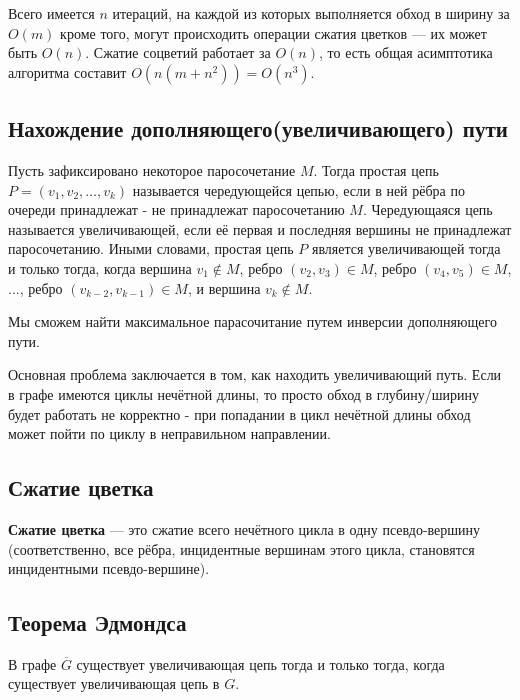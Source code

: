 \documentclass[14pt, a4paper]{extarticle}
\begin{document}
    Всего имеется $n$ итераций, на каждой из которых выполняется обход в ширину за $O(m)$ кроме того, могут происходить операции сжатия цветков — их может быть $O(n)$. Сжатие соцветий работает за $O(n)$, то есть общая асимптотика алгоритма составит $O(n(m+n^2))=O(n^3)$.

    \subsection*{Нахождение дополняющего(увеличивающего) пути}

    Пусть зафиксировано некоторое паросочетание $M$. Тогда простая цепь $P = (v_1, v_2, \ldots, v_k)$ называется чередующейся цепью, если в ней рёбра по очереди принадлежат - не принадлежат паросочетанию $M$. Чередующаяся цепь называется увеличивающей, если её первая и последняя вершины не принадлежат паросочетанию. Иными словами, простая цепь $P$ является увеличивающей тогда и только тогда, когда вершина $v_1 \not\in M$, ребро $(v_2,v_3) \in M$, ребро $(v_4,v_5) \in M$, ..., ребро $(v_{k-2},v_{k-1}) \in M$, и вершина $v_k \not\in M$.

    Мы сможем найти максимальное парасочитание путем инверсии дополняющего пути.

    Основная проблема заключается в том, как находить увеличивающий путь. Если в графе имеются циклы нечётной длины, то просто обход в глубину/ширину будет работать не корректно - при попадании в цикл нечётной длины обход может пойти по циклу в неправильном направлении.

    \pagebreak

    \subsection*{Сжатие цветка}

    \textbf{Сжатие цветка} — это сжатие всего нечётного цикла в одну псевдо-вершину (соответственно, все рёбра, инцидентные вершинам этого цикла, становятся инцидентными псевдо-вершине).
    
    \subsection*{Теорема Эдмондса}
    
    В графе $\overline G$ существует увеличивающая цепь тогда и только тогда, когда существует увеличивающая цепь в $G$.
\end{document}
